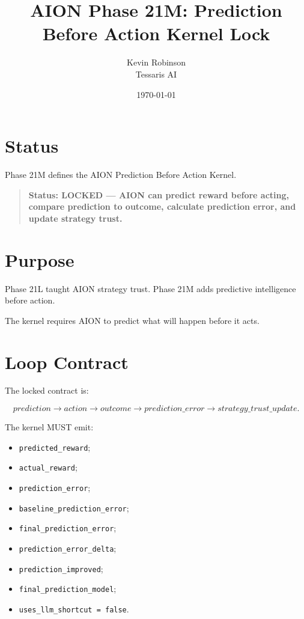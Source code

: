 \documentclass[11pt,a4paper]{article}
\title{\textbf{AION Phase 21M: Prediction Before Action Kernel Lock}}
\author{Kevin Robinson\\Tessaris AI}
\date{\today}
\begin{document}
\maketitle

\section{Status}

Phase 21M defines the AION Prediction Before Action Kernel.

\begin{quote}
\textbf{Status: LOCKED --- AION can predict reward before acting, compare prediction to outcome, calculate prediction error, and update strategy trust.}
\end{quote}

\section{Purpose}

Phase 21L taught AION strategy trust. Phase 21M adds predictive intelligence before action.

The kernel requires AION to predict what will happen before it acts.

\section{Loop Contract}

The locked contract is:

\[
prediction \rightarrow action \rightarrow outcome
\rightarrow prediction\_error \rightarrow strategy\_trust\_update.
\]

The kernel MUST emit:

\begin{itemize}
  \item \texttt{predicted\_reward};
  \item \texttt{actual\_reward};
  \item \texttt{prediction\_error};
  \item \texttt{baseline\_prediction\_error};
  \item \texttt{final\_prediction\_error};
  \item \texttt{prediction\_error\_delta};
  \item \texttt{prediction\_improved};
  \item \texttt{final\_prediction\_model};
  \item \texttt{uses\_llm\_shortcut = false}.
\end{itemize}
\end{document}
